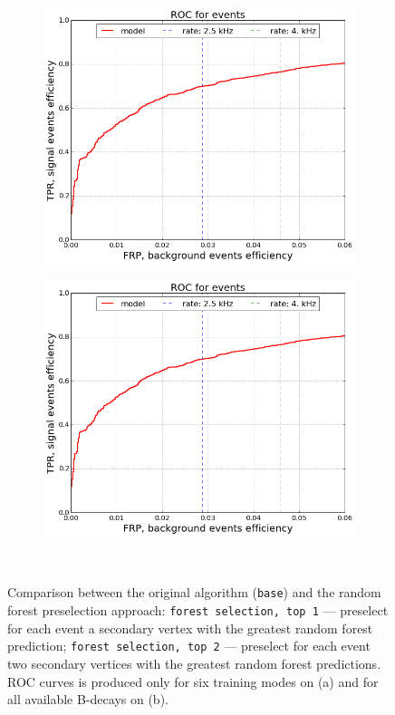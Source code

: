 \documentclass{llncs}
\begin{document}
\begin{figure}
	\begin{center}
    	\begin{subfigure}[b]{0.45\textwidth}
    		\includegraphics[width=\textwidth]{../../img/roc_events.png} \caption{}
    	\end{subfigure} %
    	\begin{subfigure}[b]{0.45\textwidth}
    		\includegraphics[width=\textwidth]{../../img/roc_events.png} \caption{} %
    	\end{subfigure}
    \end{center}
  \caption{Comparison between the original algorithm (\texttt{base}) and the random forest preselection approach: \texttt{forest selection, top 1} --- preselect for each event a secondary vertex with the greatest random forest prediction; \texttt{forest selection, top 2} --- preselect for each event two secondary vertices with the greatest random forest predictions. ROC curves is produced only for six training modes on (a) and for all available B-decays on (b).}~\label{fig:forest_simple}
\end{figure}
\end{document}
